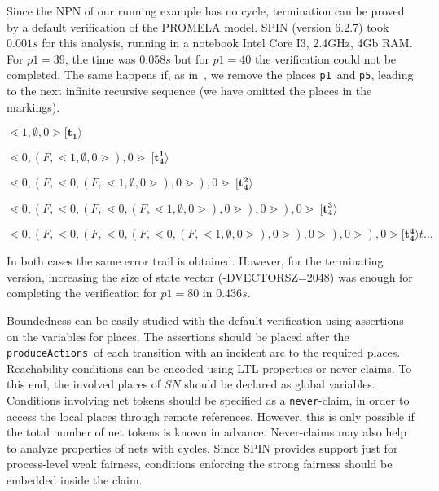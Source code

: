 \documentclass{llncs}
\begin{document}
\begin{example}
\label{ex:spin-prop1-fact}
Since the NPN of our running example has no cycle, termination can be proved by a default verification of the PROMELA model. SPIN (version 6.2.7) took $0.001s$ for this analysis, running in a notebook Intel Core I3, 2.4GHz, 4Gb RAM. For $p1=39$, the time was $0.058s$ but for $p1 =40$ the verification could not be completed. The same happens if, as in~\cite{Lomazova01}, we remove the places \small\verb"p1"\nfont\ and \small\verb"p5"\nfont, leading to the next infinite recursive sequence (we have omitted the places in the markings).

\vspace{7pt}
$\lessdot 1,\emptyset, 0\gtrdot\mathbf{[t_1\rangle}$

$\lessdot 0, (F,\lessdot 1,\emptyset,0\gtrdot),0\gtrdot \ \mathbf{[t^1_4\rangle}$

$\lessdot 0, (F,\lessdot 0,(F,\lessdot 1,\emptyset,0\gtrdot),0\gtrdot),0\gtrdot\ \mathbf{[t^2_4\rangle}$

$\lessdot 0, (F,\lessdot 0,(F,\lessdot 0,(F,\lessdot 1,\emptyset,0\gtrdot),0\gtrdot),0\gtrdot),0\gtrdot\ \mathbf{[t^3_4\rangle} $

$\lessdot 0, (F,\lessdot 0,(F,\lessdot 0,(F,\lessdot 0,(F,\lessdot 1,\emptyset,0\gtrdot),0\gtrdot),0\gtrdot),0\gtrdot),0\gtrdot \mathbf{[t^4_4\rangle} t\ldots $

\vspace{7pt}

In both cases the same error trail is obtained. However, for the terminating version, increasing the size of state vector (-DVECTORSZ=2048) was enough for completing the verification for $p1=80$ in $0.436s$.
\end{example}



Boundedness can be easily studied with the default verification using assertions on the variables for places. The assertions should be placed after the \small\verb"produceActions"\nfont\ of each transition with an incident arc to the required places. Reachability conditions can be encoded using LTL properties or never claims. To this end, the involved places of $SN$ should be declared as global variables. Conditions involving net tokens should be specified as  a \small\texttt{never}\nfont-claim, in order to access the local places through remote references. However, this is only possible if the total number of net tokens is known in advance. Never-claims may also help to analyze properties of nets with cycles. Since SPIN  provides support just for process-level weak fairness, conditions enforcing the strong fairness should be embedded inside the claim.
\end{document}
